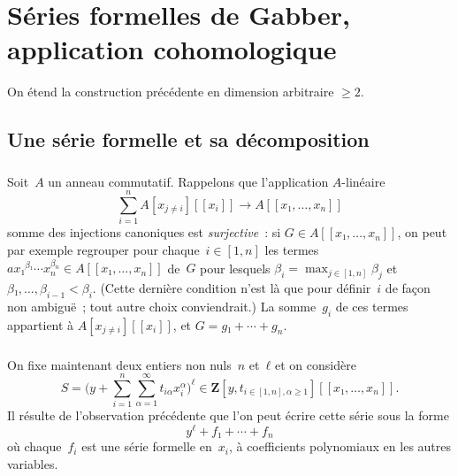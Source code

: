 \documentclass[10pt]{../fichiers-configuration-latex/smfart}
\begin{document}
\section{Séries formelles de Gabber, application cohomologique}
\label{18B-Gabber-Nagata-dimension-supérieure}

On étend la construction précédente en dimension
arbitraire $≥ 2$.

\subsection{Une série formelle et sa décomposition}

\subsubsection{}
\label{18B-décomposition-série-formelle}
Soit $A$ un anneau commutatif.
Rappelons que l'application $A$-linéaire
\[
∑_{i=1}^n A[x_{j ≠ i}][[x_i]] → A[[x₁,…,x_n]]
\]
somme des injections canoniques est \emph{surjective} :
si $G ∈  A[[x₁,…,x_n]]$, on peut par exemple regrouper pour chaque $i ∈ [1,n]$
les termes $ax₁^{β₁}\cdots x_n^{β_n} ∈ A[[x₁,…,x_n]]$ de $G$
pour lesquels $β_i=\max_{j ∈ [1,n]} β_j$ et $β₁,…,β_{i-1}<β_i$.
(Cette dernière condition n'est là que pour définir $i$
de façon non ambiguë ; tout autre choix conviendrait.)
La somme $g_i$ de ces termes appartient à $A[x_{j ≠ i}][[x_i]]$, et
$G=g₁+\cdots+g_n$.

\subsubsection{}On fixe maintenant deux entiers non nuls $n$ et $ℓ$
et on considère
\[
S=\big(y + ∑_{i=1}^n ∑_{α=1}^{∞} t_{i α} x_i^α\big)^ℓ ∈ 𝐙[y,t_{i
∈ [1,n], α ≥ 1}][[x₁,…,x_n]].
\]
Il résulte de l'observation précédente que l'on peut écrire cette
série sous la forme
\[
y^ℓ + f₁+\cdots+f_n
\]
où chaque $f_i$ est une série formelle en $x_i$, à
coefficients polynomiaux en les autres variables.
\end{document}
